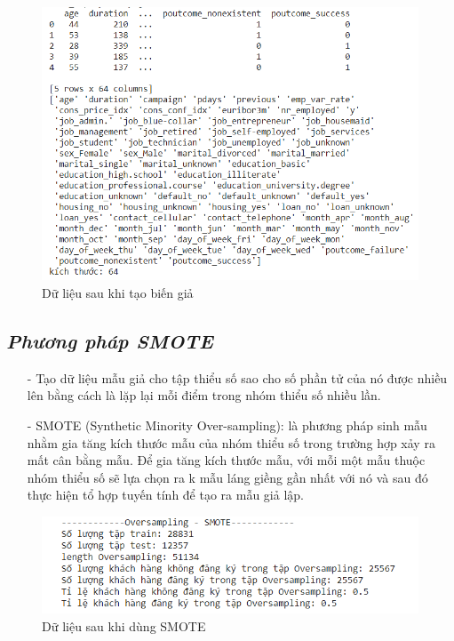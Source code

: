 \documentclass{report}
\begin{document}
\begin{enumerate}
\begin{center}
\begin{figure}[htp]
\begin{center}
    		\includegraphics[scale =0.9]{images/nummy2.PNG}
    	\end{center}
    		\caption{Dữ liệu sau khi tạo biến giả}
    \end{figure}
        \end{center}
        \end{enumerate}
 \subsection{ \textit{Phương pháp SMOTE}}
        \fontsize{13}{14}\selectfont
    \begin{itemize}
                        \item [- ]Tạo dữ liệu mẫu giả cho tập thiểu số sao cho số phần tử của nó được nhiều lên bằng cách là lặp lại mỗi điểm trong nhóm thiểu số nhiều lần.
                        \item [- ]SMOTE (Synthetic Minority Over-sampling): là phương pháp sinh mẫu nhằm gia tăng kích thước mẫu của nhóm thiểu số trong trường hợp xảy ra mất cân bằng mẫu. Để gia tăng kích thước mẫu, với mỗi một mẫu thuộc nhóm thiểu số sẽ lựa chọn ra k mẫu láng giềng gần nhất với nó và sau đó thực hiện tổ hợp tuyến tính để tạo ra mẫu giả lập.
\end{itemize}
\pagebreak
            \begin{center}
        \begin{figure}[htp]
    	\begin{center}
    		\includegraphics[scale =1]{images/smote.PNG}
    	\end{center}
    		\caption{Dữ liệu sau khi dùng SMOTE}
    \end{figure}
        \end{center}
  
\end{document}
